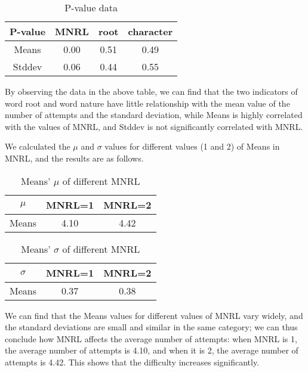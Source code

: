 \documentclass[12pt]{article}  %
\begin{document}
\begin{table*}
	\centering
	\begin{tabular}{  |c|c|c|c|
		}
		
		\hline
		P-value 	& MNRL	& root	 & character \\ 
		\hline
		Means	& 0.00  &  0.51 & 0.49 \\ 
		\hline 
		Stddev & 0.06 & 0.44 & 0.55  \\ 
		\hline 
		
	\end{tabular}
	\caption{P-value data}
	\label{tab:pdata}
\end{table*}
By observing the data in the above table, we can find that the two indicators of word root and word nature have little relationship with the mean value of the number of attempts and the standard deviation, while Means is highly correlated with the values of MNRL, and Stddev is not significantly correlated with MNRL.

We calculated the $\mu$ and $\sigma$ values for different values (1 and 2) of Means in MNRL, and the results are as follows.
\begin{table*}
	\centering
	\begin{tabular}{  |c|c|c|
		}
		
		\hline
		$\mu$ 	& MNRL=1 & MNRL=2 \\ 
		\hline
		Means	& 4.10  &  4.42 \\ 
		\hline 
		
	\end{tabular}
	\caption{Means' $\mu$  of different MNRL}
	\label{tab:miu}
\end{table*}

\begin{table*}
	\centering
	\begin{tabular}{  |c|c|c|
		}
		
		\hline
		$\sigma$ 	& MNRL=1 & MNRL=2 \\ 
		\hline
		Means	& 0.37  &  0.38 \\ 
		\hline 
		
	\end{tabular}
	\caption{Means' $\sigma$ of different MNRL}
	\label{tab:sigma}
\end{table*}

We can find that the Means values for different values of MNRL vary widely, and the standard deviations are small and similar in the same category; we can thus conclude how MNRL affects the average number of attempts: when MNRL is 1, the average number of attempts is 4.10, and when it is 2, the average number of attempts is 4.42. This shows that the difficulty increases significantly.
\end{document}
